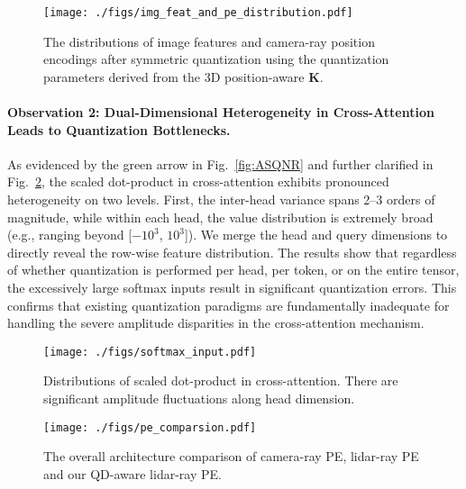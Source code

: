 \begin{figure}[htb]
\vspace{-2mm}
\centering
	\texttt{[image: ./figs/img\_feat\_and\_pe\_distribution.pdf]}
    \vspace{-0.3cm}
	\caption{The distributions of image features and camera-ray position encodings after symmetric quantization using the quantization parameters derived from the 3D position-aware $\mathbf{K}$.}
    \label{fig:magnitude_distributions_of_image_feature_and_camera_ray_PE}
    \vspace{-0.5cm}
\end{figure}


\paragraph{Observation 2: Dual-Dimensional Heterogeneity in Cross-Attention Leads to Quantization Bottlenecks.}

As evidenced by the green arrow in Fig.~\ref{fig:ASQNR} and further clarified in Fig.~\ref{fig:scaled_dot_product}, the scaled dot-product in cross-attention exhibits pronounced heterogeneity on two levels. First, the inter-head variance spans 2–3 orders of magnitude, while within each head, the value distribution is extremely broad (e.g., ranging beyond [$-10^3$, $10^3$]). We merge the head and query dimensions to directly reveal the row-wise feature distribution. The results show that regardless of whether quantization is performed per head, per token, or on the entire tensor, the excessively large softmax inputs result in significant quantization errors. This confirms that existing quantization paradigms are fundamentally inadequate for handling the severe amplitude disparities in the cross-attention mechanism.



\begin{figure}[htb]
\centering
	\texttt{[image: ./figs/softmax\_input.pdf]}
    \vspace{-0.6cm}
	\caption{Distributions of scaled dot-product in cross-attention. There are significant amplitude fluctuations along head dimension.}
	\label{fig:scaled_dot_product}
    \vspace{-0.3cm}
\end{figure}



\begin{figure*}[htb]
\centering
	\texttt{[image: ./figs/pe\_comparsion.pdf]}
    \vspace{-0.3cm}
	\caption{
 The overall architecture comparison of camera-ray PE, lidar-ray PE and our QD-aware lidar-ray PE.
	}
	\label{fig:pe_compare}
\end{figure*}
\vspace{-2mm}


